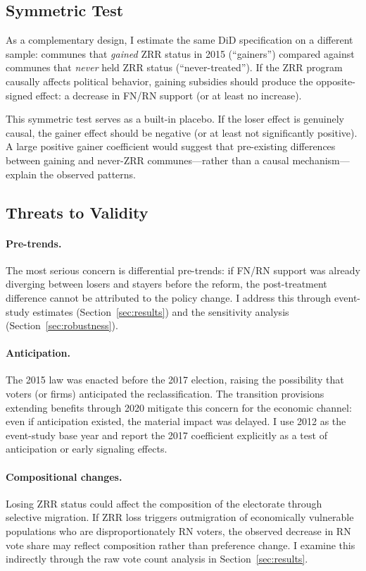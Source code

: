 \documentclass[12pt]{article}
\begin{document}
\subsection{Symmetric Test}

As a complementary design, I estimate the same DiD specification on a different sample: communes that \textit{gained} ZRR status in 2015 (``gainers'') compared against communes that \textit{never} held ZRR status (``never-treated''). If the ZRR program causally affects political behavior, gaining subsidies should produce the opposite-signed effect: a decrease in FN/RN support (or at least no increase).

This symmetric test serves as a built-in placebo. If the loser effect is genuinely causal, the gainer effect should be negative (or at least not significantly positive). A large positive gainer coefficient would suggest that pre-existing differences between gaining and never-ZRR communes---rather than a causal mechanism---explain the observed patterns.

\subsection{Threats to Validity}

\paragraph{Pre-trends.} The most serious concern is differential pre-trends: if FN/RN support was already diverging between losers and stayers before the reform, the post-treatment difference cannot be attributed to the policy change. I address this through event-study estimates (Section~\ref{sec:results}) and the \citet{rambachan2023more} sensitivity analysis (Section~\ref{sec:robustness}).

\paragraph{Anticipation.} The 2015 law was enacted before the 2017 election, raising the possibility that voters (or firms) anticipated the reclassification. The transition provisions extending benefits through 2020 mitigate this concern for the economic channel: even if anticipation existed, the material impact was delayed. I use 2012 as the event-study base year and report the 2017 coefficient explicitly as a test of anticipation or early signaling effects.

\paragraph{Compositional changes.} Losing ZRR status could affect the composition of the electorate through selective migration. If ZRR loss triggers outmigration of economically vulnerable populations who are disproportionately RN voters, the observed decrease in RN vote share may reflect composition rather than preference change. I examine this indirectly through the raw vote count analysis in Section~\ref{sec:results}.
\end{document}
